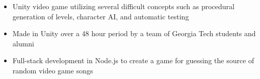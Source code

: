 
\begin{samepage}
\begin{itemize}[noitemsep,topsep=0pt,parsep=0pt,partopsep=0pt]
    \item Unity video game utilizing several difficult concepts such as procedural generation of levels, character AI, and automatic testing
\end{itemize}
\end{samepage}

\smallskip

\begin{samepage}
\begin{itemize}[noitemsep,topsep=0pt,parsep=0pt,partopsep=0pt]
    \item Made in Unity over a 48 hour period by a team of Georgia Tech students and alumni
\end{itemize}
\end{samepage}

\smallskip

\begin{samepage}
\begin{itemize}[noitemsep,topsep=0pt,parsep=0pt,partopsep=0pt]
    \item Full-stack development in Node.js to create a game for guessing the source of random video game songs
\end{itemize}
\end{samepage}